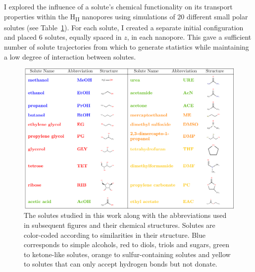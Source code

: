 \documentclass{article}
\begin{document}
  I explored the influence of a solute's chemical functionality on its 
  transport properties within the H\textsubscript{II} nanopores using simulations
  of 20 different small polar solutes (see Table~\ref{fig:solute_table}).
  For each solute, I created a separate initial configuration and placed 6 
  solutes, equally spaced in $z$, in each nanopore. This gave a sufficient
  number of solute trajectories from which to generate statistics while 
  maintaining a low degree of interaction between solutes. 
  
  
  \begin{figure}
  \includegraphics[width=\textwidth]{solute_table.pdf}
  \caption{The solutes studied in this work along with the abbreviations used
  in subsequent figures and their chemical structures. Solutes are color-coded
  according to similarities in their structure. Blue corresponds to simple 
  alcohols, red to diols, triols and sugars, green to ketone-like solutes, 
  orange to sulfur-containing solutes and yellow to solutes that can only accept
  hydrogen bonds but not donate.}\label{fig:solute_table}
  \vspace{-0.5cm}
  \end{figure}
\end{document}

